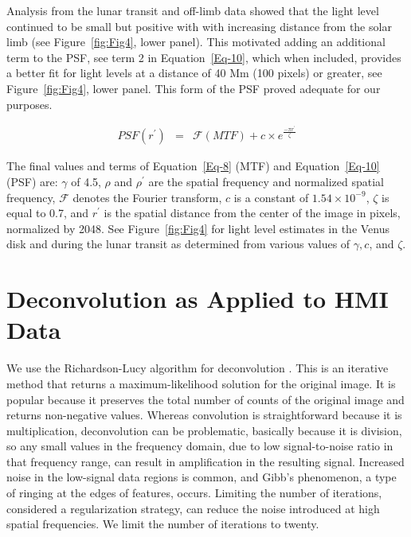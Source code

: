 \documentclass[trackchanges]{aastex62}
\begin{document}
Analysis from the lunar transit and off-limb data showed that the light level continued to be small but positive with with increasing distance from the solar limb (see Figure~\ref{fig:Fig4}, lower panel). This motivated adding an additional term to the PSF, see term 2 in  Equation~\ref{Eq-10}, which when included, provides a better fit for light levels at a distance of 40 Mm (100 pixels) or greater, see Figure~\ref{fig:Fig4}, lower panel. This form of the PSF proved adequate for our purposes.

\begin{eqnarray}
    PSF(r^{\prime}) &=& \mathcal{F}(MTF) + c\times e^\frac{-\pi r^{\prime}}{\zeta}
    \label{Eq-10}    
\end{eqnarray}
  
The final values and terms of Equation~\ref{Eq-8} (MTF) and Equation~\ref{Eq-10} (PSF) are: $\gamma$ of 4.5, $\rho$ and $\rho^{\prime}$ are the spatial frequency and normalized spatial frequency, ${\mathcal{F}}$ denotes the Fourier transform, $c$ is a constant of $1.54 \times 10^{-9}$, $\zeta$ is equal to 0.7, and $r^{\prime}$ is the spatial distance from the center of the image in pixels, normalized by 2048. See Figure~\ref{fig:Fig4} for light level estimates in the Venus disk and during the lunar transit as determined from various values of $\gamma, c$, and $\zeta$. 
 


\section{Deconvolution as Applied to HMI Data}\label{sec:sec3}

We use the Richardson-Lucy algorithm for deconvolution {\citep{richardson:1972,lucy:1974}}. This is an iterative method that returns a maximum-likelihood solution for the original image.  It is popular because it preserves the total number of counts of the original image and returns non-negative values. Whereas convolution is straightforward because it is multiplication, deconvolution can be problematic, basically because it is division, so any small values in the frequency domain, due to low signal-to-noise ratio in that frequency range, can result in amplification in the resulting signal. Increased noise in the low-signal data regions is common, and Gibb's phenomenon, a type of ringing at the edges of features, occurs. Limiting the number of iterations, considered a regularization strategy, can reduce the noise introduced at high spatial frequencies.  We limit the number of iterations to twenty. 
\end{document}
